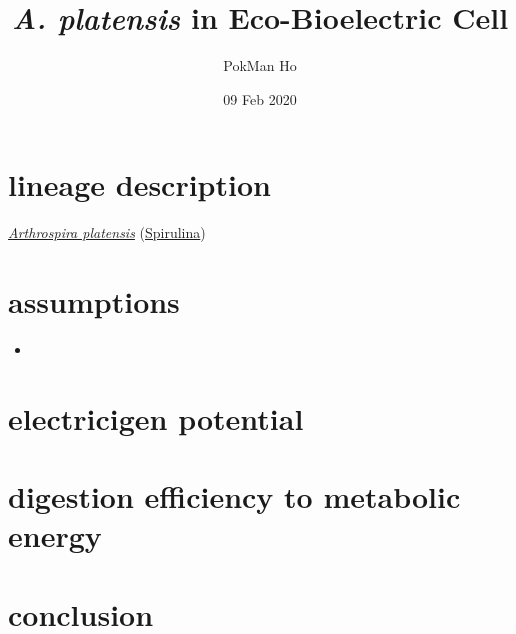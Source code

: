 \documentclass[a4paper,11pt]{article}
\title{\textit{A. platensis} in Eco-Bioelectric Cell}
\author{PokMan Ho}
\date{09 Feb 2020}
\begin{document}
    \maketitle
    \tableofcontents
    \clearpage
    
    \section{lineage description}
    \href{https://microbewiki.kenyon.edu/index.php/Arthrospira_platensis}{\textit{Arthrospira platensis}} (\href{https://microbewiki.kenyon.edu/index.php/Spirulina}{Spirulina})
    
    \section{assumptions}
    \begin{itemize}
        \item 
    \end{itemize}
    
    \section{electricigen potential}
    
    \section{digestion efficiency to metabolic energy}
    
    \section{conclusion}
    
    \nocite{*}\printbibliography
\end{document}
